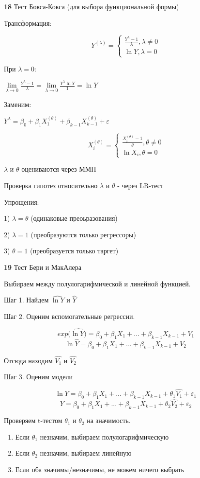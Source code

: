 \documentclass[12pt]{article}
\renewcommand{\epsilon}{\varepsilon}
\begin{document}
	
\textbf{18} Тест Бокса-Кокса (для выбора функциональной формы)

Трансформация:

\begin{equation*}
Y^{(\lambda)} = 
\begin{cases}
\frac{Y^{\lambda} - 1}{\lambda}, \lambda \neq 0\\
\ln{Y}, \lambda = 0
\end{cases}
\end{equation*} 

При $\lambda = 0$:  

$\lim\limits_{\lambda \to 0} \frac{Y^{\lambda} - 1}{\lambda} = \lim\limits_{\lambda \to 0} \frac{Y^{\lambda}\ln{Y}}{1} = \ln{Y}$

Заменим:

$Y^{\lambda} = \beta_{0} + \beta_{1}X_{1}^{(\theta)} + \beta_{k-1}X_{k-1}^{(\theta)} + \epsilon$
	
\begin{equation*}
X_{i}^{(\theta)} = 
\begin{cases}
\frac{X_{i}^{(\theta)} - 1}{\theta}, \theta \neq 0\\
\ln{X_{i}}, \theta = 0
\end{cases}
\end{equation*} 

$\lambda$ и $\theta$ оцениваются через ММП

Проверка гипотез относительно $\lambda$ и $\theta$ - через LR-тест

Упрощения:

1) $\lambda = \theta$ (одинаковые преоьразования)

2) $\lambda = 1$ (преобразуются только регрессоры)

3) $\theta = 1$ (преобразуется только таргет)
	
\textbf{19} Тест Бери и МакАлера

Выбираем между полулогарифмической и линейной функцией.

Шаг 1. Найдем $\hat{\ln{Y}}$ и $\hat{Y}$

Шаг 2. Оценим вспомогательные регрессии.

$$exp(\hat{\ln{Y})} = \beta_{0} + \beta_{1}X_{1} + ... + \beta_{k-1}X_{k-1} + V_{1}$$
$$\ln{\hat{Y}} = \beta_{0} + \beta_{1}X_{1} + ... + \beta_{k-1}X_{k-1} + V_{2} $$

Отсюда находим $\hat{V_{1}}$ и $\hat{V_{2}}$

Шаг 3. Оценим модели

$$\ln{Y} = \beta_{0} + \beta_{1}X_{1} + ... + \beta_{k-1}X_{k-1} + \theta_{1}\hat{V_{1}} + \epsilon_{1}$$
$$Y = \beta_{0} + \beta_{1}X_{1} + ... + \beta_{k-1}X_{k-1} + \theta_{2}\hat{V_{2}} + \epsilon_{2}$$

Проверяем t-тестом $\theta_{1}$ и $\theta_{2}$ на значимость.
\begin{enumerate}
	\item Если $\theta_{1}$ незначим, выбираем полулогарифмическую
	\item Если $\theta_{2}$ незначим, выбираем линейную
	\item Если оба значимы/незначимы, не можем ничего выбрать
\end{enumerate}
\end{document}
